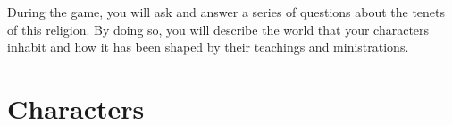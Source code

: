 \documentclass[a6paper, 11pt, parskip=half, DIV=15]{scrartcl}
\begin{document}
\vfill

\begin{center}
\end{center}

\vfill

During the game, you will ask and answer a series of questions about the tenets of this religion. By doing so, you will describe the world that your characters inhabit and how it has been shaped by their teachings and ministrations.

\newpage
\enlargethispage{1.75\baselineskip}

\section*{Characters}
\renewcommand{\thefootnote}{\fnsymbol{footnote}}
\renewcommand{\footnoterule}{%
  \kern -3pt
  \hrule width \textwidth height 0.5pt
  \kern 2pt
}
\end{document}
